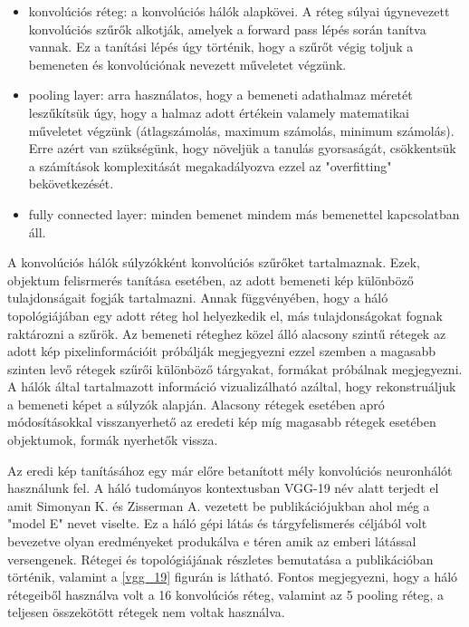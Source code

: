 \documentclass[12pt, a4paper, oneside]{book}
\theoremstyle{tetel}
\begin{document}
\begin{itemize}
	\item konvolúciós réteg: a konvolúciós hálók alapkövei. A réteg súlyai úgynevezett konvolúciós szűrők alkotják, amelyek a forward pass lépés során tanítva vannak. Ez a tanítási lépés úgy történik, hogy a szűrőt végig toljuk a bemeneten és konvolúciónak nevezett műveletet végzünk. 
	\item pooling layer: arra használatos, hogy a bemeneti adathalmaz méretét leszűkítsük úgy, hogy a halmaz adott értékein valamely matematikai műveletet végzünk (átlagszámolás, maximum számolás, minimum számolás). Erre azért van szükségünk, hogy növeljük a tanulás gyorsaságát, csökkentsük a számítások komplexitását megakadályozva ezzel az "overfitting" bekövetkezését.
	\item fully connected layer: minden bemenet mindem más bemenettel kapcsolatban áll.
\end{itemize}

A konvolúciós hálók súlyzókként konvolúciós szűrőket tartalmaznak. Ezek, objektum felisrmerés tanítása esetében, az adott bemeneti kép különböző tulajdonságait fogják tartalmazni. Annak függvényében, hogy a háló topológiájában egy adott réteg hol helyezkedik el, más tulajdonságokat fognak raktározni a szűrök. Az bemeneti réteghez közel álló alacsony szintű rétegek az adott kép pixelinformációit próbálják megjegyezni ezzel szemben a magasabb szinten levő rétegek szűrői különböző tárgyakat, formákat próbálnak megjegyezni\cite{27}\cite{28}. A hálók által tartalmazott információ vizualizálható azáltal, hogy rekonstruáljuk a bemeneti képet a súlyzók alapján. Alacsony rétegek esetében apró módosításokkal visszanyerhető az eredeti kép míg magasabb rétegek esetében objektumok, formák nyerhetők vissza.

Az eredi kép tanításához egy már előre betanított mély konvolúciós neuronhálót használunk fel. A háló tudományos kontextusban VGG-19 név alatt terjedt el amit Simonyan K. és  Zisserman A. vezetett be publikációjukban\cite{29} ahol még a "model E" nevet viselte. Ez a háló gépi látás és tárgyfelismerés céljából volt bevezetve olyan eredményeket produkálva e téren amik az emberi látással versengenek. Rétegei és topológiájának részletes bemutatása a \cite{29} publikációban történik, valamint a \ref{vgg_19} figurán is látható. Fontos megjegyezni, hogy a háló rétegeiből használva volt a 16 konvolúciós réteg, valamint az 5 pooling réteg, a teljesen összekötött rétegek nem voltak használva.
\end{document}
